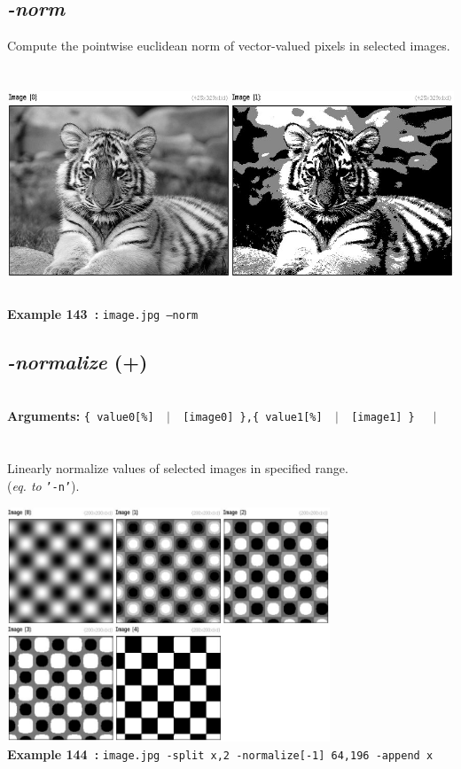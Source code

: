 \documentclass[a4paper,11pt,twoside]{book}
\begin{document}
\subsection{\emph{-norm} }\vspace*{-0.5em}
Compute the pointwise euclidean norm of vector-valued pixels in selected images.
\begin{center}\includegraphics[keepaspectratio=true,height=7cm,width=\textwidth]{img/gmic_def143.jpg}\\
{\footnotesize \textbf{Example 143~:} \texttt{image.jpg --norm}}
\end{center}

\subsection{\emph{-normalize} (+)}\vspace*{-0.5em}
~\\\textbf{Arguments: } 
{\small \texttt{\{ value0[\%] ~$|$~ [image0] \},\{ value1[\%] ~$|$~ [image1] \}}}~~~$|$\\
\hspace*{2.2cm}{\small \texttt{[image]}}\\~\\
Linearly normalize values of selected images in specified range.
~\\(\emph{eq. to} {\small \texttt{'-n'}}).
\begin{center}\includegraphics[keepaspectratio=true,height=7cm,width=\textwidth]{img/gmic_def144.jpg}\\
{\footnotesize \textbf{Example 144~:} \texttt{image.jpg -split x,2 -normalize[-1] 64,196 -append x}}
\end{center}
\end{document}
